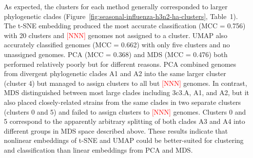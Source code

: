 \documentclass[9pt,lineno]{elife}
\def\jhc#1{\textcolor{red}{[#1]}}
\begin{document}
As expected, the clusters for each method generally corresponded to larger phylogenetic clades (Figure~\ref{fig:seasonal-influenza-h3n2-ha-clusters}, Table~1).
The t-SNE embedding produced the most accurate classification (MCC = 0.756) with 20 clusters and \jhc{NNN} genomes not assigned to a cluster.
UMAP also accurately classified genomes (MCC = 0.662) with only five clusters and no unassigned genomes.
PCA (MCC = 0.368) and MDS (MCC = 0.476) both performed relatively poorly but for different reasons.
PCA combined genomes from divergent phylogenetic clades A1 and A2 into the same larger cluster (cluster 4) but managed to assign clusters to all but \jhc{NNN} genomes.
In contrast, MDS distinguished between most large clades including 3c3.A, A1, and A2, but it also placed closely-related strains from the same clades in two separate clusters (clusters 0 and 5) and failed to assign clusters to \jhc{NNN} genomes.
Clusters 0 and 5 correspond to the apparently arbitrary splitting of both clades A3 and A4 into different groups in MDS space described above.
These results indicate that nonlinear embeddings of t-SNE and UMAP could be better-suited for clustering and classification than linear embeddings from PCA and MDS.
\end{document}

